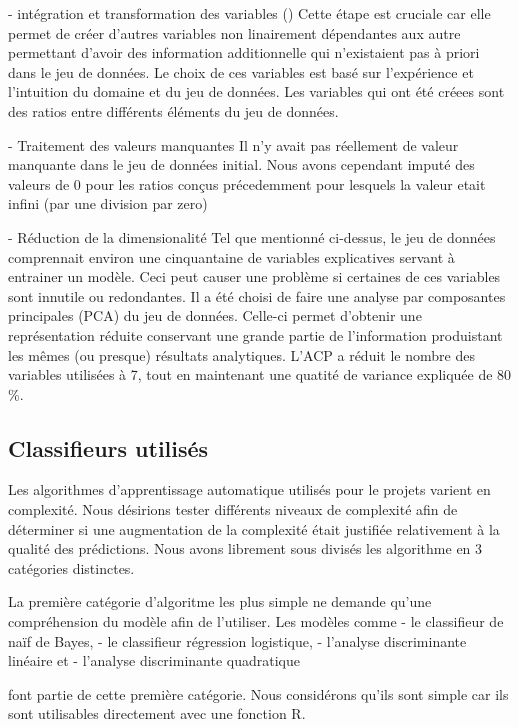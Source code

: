 - intégration et transformation des variables () 
Cette étape est cruciale car elle permet de créer d'autres variables non linairement dépendantes aux autre permettant d'avoir des information additionnelle qui n'existaient pas à priori dans le jeu de données. Le choix de ces variables est basé sur l'expérience et l'intuition du domaine et du jeu de données.
Les variables qui ont été créees sont des ratios entre différents éléments du jeu de données.

- Traitement des valeurs manquantes
Il n'y avait pas réellement de valeur manquante dans le jeu de données initial. Nous avons cependant imputé des valeurs de 0 pour les ratios conçus précedemment pour lesquels la valeur etait infini (par une division par zero)

- Réduction de la dimensionalité
Tel que mentionné ci-dessus, le jeu de données comprennait environ une cinquantaine de variables explicatives servant à entrainer un modèle. Ceci peut causer une problème si certaines de ces variables sont innutile ou redondantes. Il a été choisi de faire une analyse par composantes principales (PCA) du jeu de données. Celle-ci permet d'obtenir une représentation réduite conservant une grande partie de l'information produistant les mêmes (ou presque) résultats analytiques. L'ACP a réduit le nombre des variables utilisées à 7, tout en maintenant une quatité de variance expliquée de 80 \%. 

\subsection{Classifieurs utilisés}

Les algorithmes d'apprentissage automatique utilisés pour le projets varient en complexité. Nous désirions tester différents niveaux de complexité afin de déterminer si une augmentation de la complexité était justifiée relativement à la qualité des prédictions. Nous avons librement sous divisés les algorithme en 3 catégories distinctes. 

La première catégorie d'algoritme les plus simple ne demande qu'une compréhension du modèle afin de l'utiliser. Les modèles comme 
- le classifieur de naïf de Bayes, 
- le classifieur régression logistique, 
- l'analyse discriminante linéaire et 
- l'analyse discriminante quadratique 

font partie de cette première catégorie. Nous considérons qu'ils sont simple car ils sont utilisables directement avec une fonction R. 

